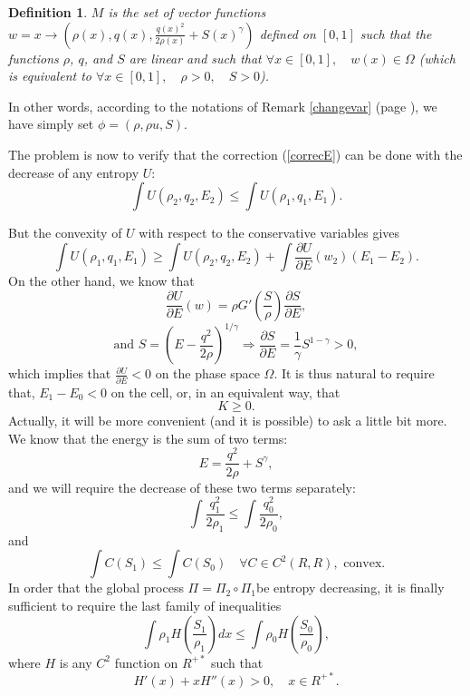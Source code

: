 \documentclass{fldauth}
\theoremstyle{plain}
\theoremstyle{plain}
\theoremstyle{plain}
\theoremstyle{plain}
\newtheorem{defn}{Definition}
\theoremstyle{plain}
\theoremstyle{plain}
\begin{document}
\begin{defn}
\label{defM}\( M \) is the set of vector functions \( w=x\rightarrow (\rho (x),q(x),\frac{q(x)^{2}}{2\rho (x)}+S(x)^{\gamma }) \)
defined on \( [0,1] \) such that the functions \( \rho  \), \( q \), and
\( S \) are linear and such that \( \forall x\in [0,1],\quad w(x)\in \Omega  \)
(which is equivalent to \( \forall x\in [0,1],\quad \rho >0,\quad S>0 \)).
\end{defn}
In other words, according to the notations of Remark
\ref{changevar} (page \pageref{changevar}), we have simply set \(
\phi =(\rho ,\rho u,S) \).

The problem is now to verify that the correction (\ref{correcE}) can be done
with the decrease of any entropy \( U \):
\[
\int U(\rho _{2},q_{2},E_{2})\leq \int U(\rho _{1},q_{1},E_{1}).\]


But the convexity of \( U \) with respect to the conservative variables gives
\[
\int U(\rho _{1},q_{1},E_{1})\geq \int U(\rho _{2},q_{2},E_{2})+\int \frac{\partial U}{\partial E}(w_{2})(E_{1}-E_{2}).\]
On the other hand, we know that
\[
\frac{\partial U}{\partial E}(w)=\rho G'(\frac{S}{\rho })\frac{\partial S}{\partial E},\]
\[
\textrm{and }S=(E-\frac{q^{2}}{2\rho })^{1/\gamma }\Rightarrow \frac{\partial S}{\partial E}=\frac{1}{\gamma }S^{1-\gamma }>0,\]
 which implies that \( \frac{\partial U}{\partial E}<0 \) on the phase space
\( \Omega  \). It is thus natural to require that, \( E_{1}-E_{0}<0 \) on
the cell, or, in an equivalent way, that
\[
K\geq 0.\]
Actually, it will be more convenient (and it is possible) to ask a little bit
more. We know that the energy is the sum of two terms:
\[
E=\frac{q^{2}}{2\rho }+S^{\gamma },\]
 and we will require the decrease of these two terms separately:
\begin{equation}
\label{inegener1}
\int \frac{q_{1}^{2}}{2\rho _{1}}\leq \int \frac{q_{0}^{2}}{2\rho _{0}},
\end{equation}
and
\begin{equation}
\label{inegener2}
\int C(S_{1})\leq \int C(S_{0})\quad \forall C\in C^{2}(R,R),\textrm{ convex}.
\end{equation}
In order that the global process \( \Pi =\Pi _{2}\circ \Pi _{1} \)be entropy
decreasing, it is finally sufficient to require the last family of inequalities
\begin{equation}
\label{inegentrop}
\int \rho _{1}H(\frac{S_{1}}{\rho _{1}})dx\leq \int \rho _{0}H(\frac{S_{0}}{\rho _{0}}),
\end{equation}
where \( H \) is any \( C^{2} \) function on \( R^{+*} \) such that
\[
H'(x)+xH''(x)>0,\quad x\in R^{+*}.\]
\end{document}
